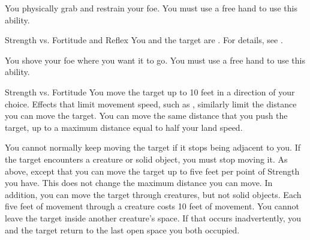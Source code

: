             \label{Grapple} You physically grab and restrain your foe.
            You must use a free hand to use this ability.
            \begin{ability}
                \begin{spelltargetinginfo}
                \end{spelltargetinginfo}
                \begin{spelleffects}
                    \begin{spellattack}{Strength vs. Fortitude and Reflex}
                        \spellsuccess You and the target are \grappled.
                        For details, see .
                    \end{spellattack}
                \end{spelleffects}
            \end{ability}

            \label{Shove} You shove your foe where you want it to go.
            You must use a free hand to use this ability.
            \begin{ability}
                \begin{spelltargetinginfo}
                \end{spelltargetinginfo}
                \begin{spelleffects}
                    \begin{spellattack}{Strength vs. Fortitude}
                        \spellsuccess You move the target up to 10 feet in a direction of your choice.
                        Effects that limit movement speed, such as , similarly limit the distance you can move the target.
                        You can move the same distance that you push the target, up to a maximum distance equal to half your land speed.

                        You cannot normally keep moving the target if it stops being adjacent to you.
                        If the target encounters a creature or solid object, you must stop moving it.
                        \spellcritical As above, except that you can move the target up to five feet per point of Strength you have.
                        This does not change the maximum distance you can move.
                        In addition, you can move the target through creatures, but not solid objects.
                        Each five feet of movement through a creature costs 10 feet of movement.
                        You cannot leave the target inside another creature's space.
                        If that occurs inadvertently, you and the target return to the last open space you both occupied.
                    \end{spellattack}
                \end{spelleffects}
            \end{ability}

